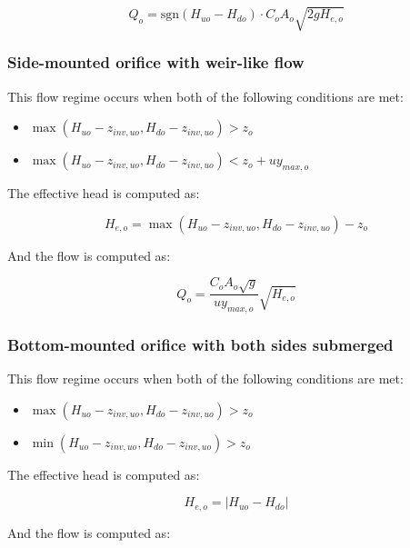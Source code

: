 \documentclass[11pt]{article}
\begin{document}
\begin{equation}
 Q_o = \text{sgn}(H_{uo} - H_{do}) \cdot C_o A_o \sqrt{2 g H_{e,o}} 
\end{equation}

\subsubsection*{Side-mounted orifice with weir-like flow}

This flow regime occurs when both of the following conditions are met:

\begin{itemize}
\item $\max(H_{uo} - z_{inv,uo}, H_{do} - z_{inv,uo}) > z_o$
\item $\max(H_{uo} - z_{inv,uo}, H_{do} - z_{inv,uo}) < z_o + u y_{max,o}$
\end{itemize}

The effective head is computed as:

\begin{equation}
  H_{e,o} = \max(H_{uo} - z_{inv,uo}, H_{do} - z_{inv,uo}) - z_{o}
\end{equation}

And the flow is computed as:

\begin{equation}
 Q_o = \frac{C_o A_o \sqrt{g}}{u y_{max,o}} \sqrt{H_{e,o}}
\end{equation}

\subsubsection*{Bottom-mounted orifice with both sides submerged}

This flow regime occurs when both of the following conditions are met:

\begin{itemize}
\item $\max(H_{uo} - z_{inv,uo}, H_{do} - z_{inv,uo}) > z_o$
\item $\min(H_{uo} - z_{inv,uo}, H_{do} - z_{inv,uo}) > z_o$
\end{itemize}

The effective head is computed as:

\begin{equation}
  H_{e,o} = | H_{uo} - H_{do} |
\end{equation}

And the flow is computed as:
\end{document}
